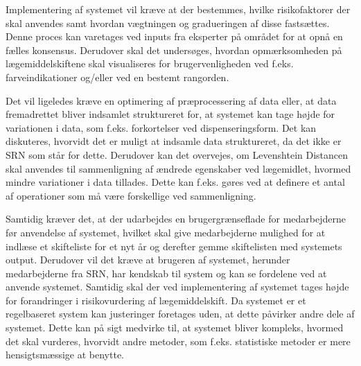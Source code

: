 Implementering af systemet vil kræve at der bestemmes, hvilke risikofaktorer der skal anvendes samt hvordan vægtningen og gradueringen af disse fastsættes. Denne proces kan varetages ved inputs fra eksperter på området for at opnå en fælles konsensus. Derudover skal det undersøges, hvordan opmærksomheden på lægemiddelskiftene skal visualiseres for brugervenligheden ved f.eks. farveindikationer og/eller ved en bestemt rangorden. 

Det vil ligeledes kræve en optimering af præprocessering af data eller, at data fremadrettet bliver indsamlet struktureret for, at systemet kan tage højde for variationen i data, som f.eks. forkortelser ved dispenseringsform. Det kan diskuteres, hvorvidt det er muligt at indsamle data struktureret, da det ikke er SRN som står for dette. Derudover kan det overvejes, om Levenshtein Distancen skal anvendes til sammenligning af ændrede egenskaber ved lægemidlet, hvormed mindre variationer i data tillades. Dette kan f.eks. gøres ved at definere et antal af operationer som må være forskellige ved sammenligning.

Samtidig kræver det, at der udarbejdes en brugergrænseflade for medarbejderne før anvendelse af systemet, hvilket skal give medarbejderne mulighed for at indlæse et skifteliste for et nyt år og derefter gemme skiftelisten med systemets output. Derudover vil det kræve at brugeren af systemet, herunder medarbejderne fra SRN, har kendskab til system og kan se fordelene ved at anvende systemet. Samtidig skal der ved implementering af systemet tages højde for forandringer i risikovurdering af lægemiddelskift. Da systemet er et regelbaseret system kan justeringer foretages uden, at dette påvirker andre dele af systemet. Dette kan på sigt medvirke til, at systemet bliver kompleks, hvormed det skal vurderes, hvorvidt andre metoder, som f.eks. statistiske metoder er mere hensigtsmæssige at benytte.




